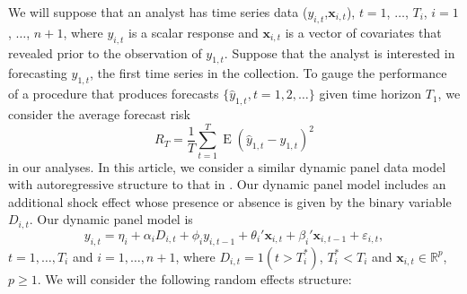 \documentclass[11pt]{article}
\newcommand{\R}{\mathbb{R}}
\newcommand{\x}{\textbf{x}}
\newcommand{\indep}{\perp\!\!\!\perp}
\DeclareMathOperator{\E}{E}
\begin{document}
We will suppose that an analyst has time series data ($y_{i,t}$,$\x_{i,t}$), 
$t = 1$, $\ldots$, $T_i$, $i = 1$, $\ldots$, $n+1$, where $y_{i,t}$ is a 
scalar response and $\x_{i,t}$ is a vector of covariates that revealed prior 
to the observation of $y_{1,t}$.  Suppose that the analyst is interested in 
forecasting $y_{1,t}$, the first time series in the collection.
To gauge the performance of a procedure that produces forecasts 
$\{\hat y_{1,t}, t= 1,2,\ldots\}$ given time horizon $T_1$, we consider the 
average forecast risk
$$
  R_T = \frac{1}{T}\sum_{t=1}^T\E(\hat y_{1,t} - y_{1,t})^2
$$
in our analyses. In this article, we consider a similar dynamic panel data 
model with autoregressive structure to that in \citet{blundell1998initial}. 
Our dynamic panel model includes an additional shock effect whose presence 
or absence is given by the binary variable $D_{i,t}$.  Our dynamic panel 
model is 
\begin{equation} \label{DPM}
  y_{i,t} = \eta_i + \alpha_iD_{i,t} + \phi_i y_{i,t-1} + \theta_i' \x_{i,t} + 
    \beta_i' \x_{i,t-1} + \varepsilon_{i,t},  
\end{equation}
$t = 1,\ldots,T_i$ and $i = 1,\ldots, n+1$, where $D_{i,t} = 1(t > T_i^*)$, 
$T_i^* < T_i$ and $\x_{i,t} \in \R^{p}$, $p \geq 1$.  We will consider 
the following random effects structure:  
\end{document}
